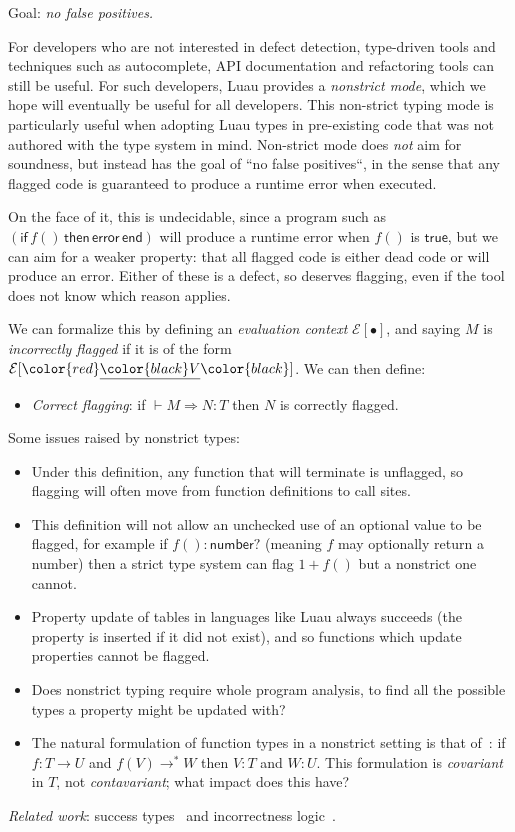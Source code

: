 \documentclass[acmsmall]{acmart}
\newcommand{\squnder}[1]{\color{red}\underline{{\color{black}#1}}\color{black}}
\newcommand{\evCtx}{\mathcal{E}}
\newcommand{\TRUE}{\mathsf{true}}
\newcommand{\NUMBER}{\mathsf{number}}
\newcommand{\ERROR}{\mathsf{error}}
\newcommand{\IF}{\mathsf{if}\,}
\newcommand{\THEN}{\,\mathsf{then}\,}
\newcommand{\END}{\,\mathsf{end}}
\begin{document}
Goal: \emph{no false positives.}

For developers who are not interested in defect detection, type-driven
tools and techniques such as autocomplete, API documentation
and refactoring tools can still be useful.
For such developers, Luau provides a
\emph{nonstrict mode}, which we hope will eventually be useful for all
developers.  This non-strict typing mode is particularly useful when
adopting Luau types in pre-existing code that was not authored with
the type system in mind.  Non-strict mode does \emph{not} aim for
soundness, but instead has the goal of ``no false positives``, in the
sense that any flagged code is guaranteed to produce a runtime error
when executed.

On the face of it, this is undecidable, since a program such as
$(\IF f() \THEN \ERROR \END)$ will produce a runtime error when $f()$ is
$\TRUE$, but we can aim for a weaker property: that all flagged code
is either dead code or will produce an error. Either of these is a
defect, so deserves flagging, even if the tool does not know
which reason applies.

We can formalize this by defining an \emph{evaluation context}
$\evCtx[\bullet]$, and saying $M$ is \emph{incorrectly flagged}
if it is of the form $\evCtx[\squnder{V}]$. We can then define:
\begin{itemize}
\item \emph{Correct flagging}: if ${} \vdash M \Rightarrow N : T$
  then $N$ is correctly flagged.
\end{itemize}
Some issues raised by nonstrict types:
\begin{itemize}

\item Under this definition, any function that will terminate is unflagged, so
  flagging will often move from function definitions to call sites.

\item This definition will not allow an unchecked use of an optional value
  to be flagged, for example if $f() : \NUMBER?$ (meaning $f$ may optionally return a number)
  then a strict type system can flag $1 + f()$ but a nonstrict one cannot.

\item Property update of tables in languages like Luau always succeeds
  (the property is inserted if it did not exist), and so functions which
  update properties cannot be flagged.

\item Does nonstrict typing require whole program analysis,
  to find all the possible types a property might be updated with?

\item The natural formulation of function types in a nonstrict setting
  is that of~\cite{SuccessTyping}: if $f: T \rightarrow U$ and $f(V) \rightarrow^* W$
  then $V:T$ and $W:U$. This formulation is \emph{covariant} in $T$,
  not \emph{contavariant}; what impact does this have?
  
\end{itemize}
\emph{Related work}: success types~\cite{SuccessTyping} and incorrectness logic~\cite{IncorrectnessLogic}.
\end{document}

